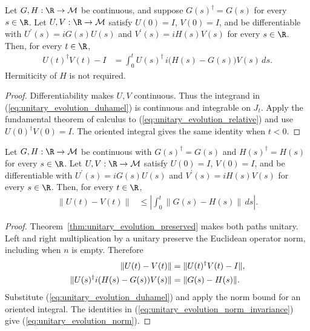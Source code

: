 \begin{theorem}
    \label{thm:unitary_evolution_duhamel}
    \leanok
    Let $G,H:\R\to\mathcal M$ be continuous, and suppose
    $G(s)^\dagger=G(s)$ for every $s\in\R$.
    Let $U,V:\R\to\mathcal M$ satisfy $U(0)=I$, $V(0)=I$, and
    be differentiable with $U^{\prime}(s)=iG(s)U(s)$ and
    $V^{\prime}(s)=iH(s)V(s)$ for every $s\in\R$.
    Then, for every $t\in\R$,
    \begin{align}
        U(t)^\dagger V(t)-I
            &=\int_0^t U(s)^\dagger\,i\bigl(H(s)-G(s)\bigr)V(s)\,ds.
        \label{eq:unitary_evolution_duhamel}
    \end{align}
    Hermiticity of $H$ is not required.
\end{theorem}
\begin{proof}\leanok
    Differentiability makes $U,V$ continuous. Thus the integrand in
    (\ref{eq:unitary_evolution_duhamel}) is continuous and integrable
    on $J_t$. Apply the fundamental theorem of calculus to
    (\ref{eq:unitary_evolution_relative}) and use
    $U(0)^\dagger V(0)=I$. The oriented integral gives the same
    identity when $t<0$.
\end{proof}

\begin{theorem}
    \label{thm:unitary_evolution_norm}
    \leanok
    Let $G,H:\R\to\mathcal M$ be continuous with
    $G(s)^\dagger=G(s)$ and $H(s)^\dagger=H(s)$ for every $s\in\R$.
    Let $U,V:\R\to\mathcal M$ satisfy $U(0)=I$, $V(0)=I$, and
    be differentiable with $U^{\prime}(s)=iG(s)U(s)$ and
    $V^{\prime}(s)=iH(s)V(s)$ for every $s\in\R$.
    Then, for every $t\in\R$,
    \begin{align}
        \|U(t)-V(t)\|
            &\le\left|\int_0^t\|G(s)-H(s)\|\,ds\right|.
        \label{eq:unitary_evolution_norm}
    \end{align}
\end{theorem}
\begin{proof}\leanok
    Theorem~\ref{thm:unitary_evolution_preserved} makes both paths
    unitary. Left and right multiplication by a unitary preserve the
    Euclidean operator norm, including when $n$ is empty. Therefore
    \begin{align}
        \|U(t)-V(t)\|&=\|U(t)^\dagger V(t)-I\|,
        \label{eq:unitary_evolution_norm_invariance}\\
        \|U(s)^\dagger i(H(s)-G(s))V(s)\|
            &=\|G(s)-H(s)\|.\notag
    \end{align}
    Substitute (\ref{eq:unitary_evolution_duhamel}) and apply the norm
    bound for an oriented integral. The identities in
    (\ref{eq:unitary_evolution_norm_invariance}) give
    (\ref{eq:unitary_evolution_norm}).
\end{proof}

